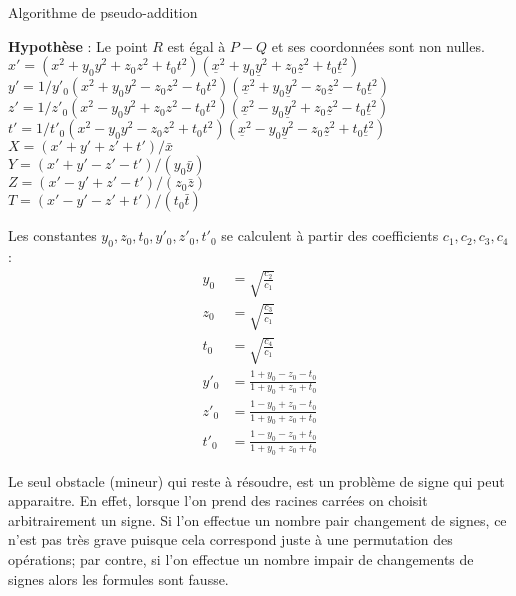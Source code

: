 \documentclass[a4paper]{article}
\theoremstyle{definition}
\theoremstyle{remark}
\numberwithin{equation}{section}
\begin{document}
\begin{algorithm}
\label{ADD2}
\caption{Algorithme de pseudo-addition}
\textbf{Hypothèse} : Le point $R$ est égal à $P-Q$ et ses coordonnées sont non nulles. \\
$x' = (x^2 + y_0y^2 + z_0z^2 + t_0t^2)(\underline{x}^2 + y_0\underline{y}^2 + z_0\underline{z}^2 + t_0\underline{t}^2)$ \\
$y' = 1/y'_0(x^2 + y_0y^2 - z_0z^2 - t_0t^2)(\underline{x}^2 + y_0\underline{y}^2 - z_0\underline{z}^2 - t_0\underline{t}^2)$ \\
$z' = 1/z'_0(x^2 - y_0y^2 + z_0z^2 - t_0t^2)(\underline{x}^2 - y_0\underline{y}^2 + z_0\underline{z}^2 - t_0\underline{t}^2)$ \\
$t' = 1/t'_0(x^2 - y_0y^2 - z_0z^2 + t_0t^2)(\underline{x}^2 - y_0\underline{y}^2 - z_0\underline{z}^2 + t_0\underline{t}^2)$ \\
$X = (x' + y' + z' + t')/\bar{x}$ \\
$Y = (x' + y' - z' - t')/(y_0\bar{y})$ \\
$Z = (x' - y' + z' - t')/(z_0\bar{z})$ \\
$T = (x' - y' - z' + t')/(t_0\bar{t})$ \\
\end{algorithm}
Les constantes $y_0,z_0,t_0,y'_0,z'_0,t'_0$ se calculent à partir des coefficients $c_1,c_2,c_3,c_4$ :
\begin{align*}
y_0 &= \sqrt{\frac{c_2}{c_1}} \\
z_0 &= \sqrt{\frac{c_3}{c_1}} \\
t_0 &= \sqrt{\frac{c_4}{c_1}} \\
y'_0 &= \frac{1+y_0-z_0-t_0}{1+y_0+z_0+t_0} \\
z'_0 &= \frac{1-y_0+z_0-t_0}{1+y_0+z_0+t_0} \\
t'_0 &= \frac{1-y_0-z_0+t_0}{1+y_0+z_0+t_0}
\end{align*}

Le seul obstacle (mineur) qui reste à résoudre, est un problème de signe qui peut apparaitre. En effet, lorsque l'on prend des racines carrées on choisit arbitrairement un signe. Si l'on effectue un nombre pair changement de signes, ce n'est pas très grave puisque cela correspond juste à une permutation des opérations; par contre, si l'on effectue un nombre impair de changements de signes alors les formules sont fausse.
\end{document}
